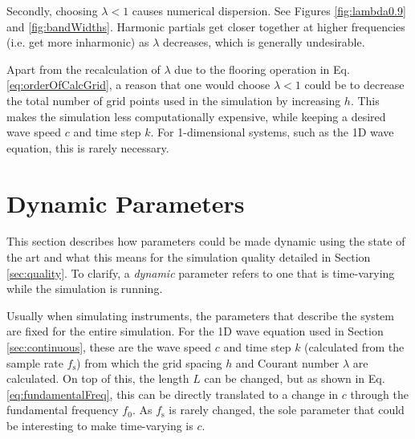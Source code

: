 \documentclass[dvipsnames, reprint]{JASA}
\begin{document}
Secondly, choosing $\lambda < 1$ causes numerical dispersion. See Figures \ref{fig:lambda0.9} and \ref{fig:bandWidths}. Harmonic partials get closer together at higher frequencies (i.e. get more inharmonic) as $\lambda$ decreases, which is generally undesirable.

Apart from the recalculation of $\lambda$ due to the flooring operation in Eq. \eqref{eq:orderOfCalcGrid}, a reason that one would choose $\lambda < 1$ could be to decrease the total number of grid points used in the simulation by increasing $h$. This makes the simulation less computationally expensive, while keeping a desired wave speed $c$ and time step $k$. For 1-dimensional systems, such as the 1D wave equation, this is rarely necessary.

\section{Dynamic Parameters}
This section describes how parameters could be made dynamic using the state of the art and what this means for the simulation quality detailed in Section \ref{sec:quality}. %
To clarify, a \textit{dynamic} parameter refers to one that is time-varying while the simulation is running. 


Usually when simulating instruments, the parameters that describe the system are fixed for the entire simulation. For the 1D wave equation used in Section \ref{sec:continuous}, these are the wave speed $c$ and time step $k$ (calculated from the sample rate $f_\text{s}$) from which the grid spacing $h$ and Courant number $\lambda$ are calculated. On top of this, the length $L$ can be changed, but as shown in Eq. \eqref{eq:fundamentalFreq}, this can be directly translated to a change in $c$ through the fundamental frequency $f_0$. As $f_\text{s}$ is rarely changed, the sole parameter that could be interesting to make time-varying is $c$. 
\end{document}
